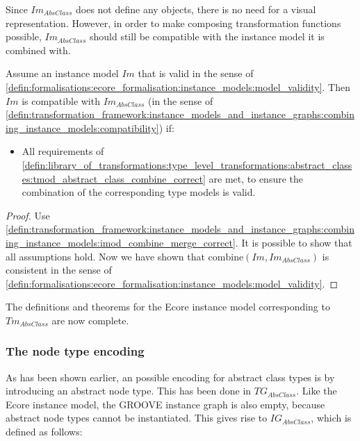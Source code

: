 Since $Im_{AbsClass}$ does not define any objects, there is no need for a visual representation. However, in order to make composing transformation functions possible, $Im_{AbsClass}$ should still be compatible with the instance model it is combined with.

\begin{thm}
\label{defin:library_of_transformations:instance_level_transformations:abstract_classes:imod_abstract_class_combine_correct}
Assume an instance model $Im$ that is valid in the sense of \cref{defin:formalisations:ecore_formalisation:instance_models:model_validity}. Then $Im$ is compatible with $Im_{AbsClass}$ (in the sense of \cref{defin:transformation_framework:instance_models_and_instance_graphs:combining_instance_models:compatibility}) if:
\begin{itemize}
    \item All requirements of \cref{defin:library_of_transformations:type_level_transformations:abstract_classes:tmod_abstract_class_combine_correct} are met, to ensure the combination of the corresponding type models is valid.
\end{itemize}
\end{thm}

\begin{proof}
Use \cref{defin:transformation_framework:instance_models_and_instance_graphs:combining_instance_models:imod_combine_merge_correct}. It is possible to show that all assumptions hold. Now we have shown that $\mathrm{combine}(Im, Im_{AbsClass})$ is consistent in the sense of \cref{defin:formalisations:ecore_formalisation:instance_models:model_validity}.
\end{proof}

The definitions and theorems for the Ecore instance model corresponding to $Tm_{AbsClass}$ are now complete. 

\subsubsection{The node type encoding}

As has been shown earlier, an possible encoding for abstract class types is by introducing an abstract node type. This has been done in $TG_{AbsClass}$. Like the Ecore instance model, the GROOVE instance graph is also empty, because abstract node types cannot be instantiated. This gives rise to $IG_{AbsClass}$, which is defined as follows:

